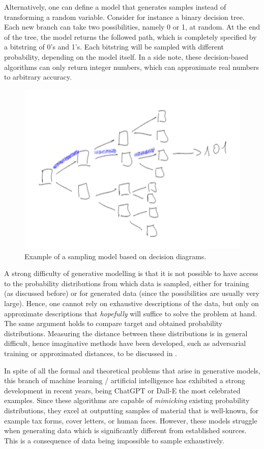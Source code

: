 \documentclass[]{report}
\begin{document}
Alternatively, one can define a model that generates samples instead of transforming a random variable. Consider for instance a binary decision tree. Each new branch can take two possibilities, namely 0 or 1, at random. At the end of the tree, the model returns the followed path, which is completely specified by a bitstring of 0's and 1's. Each bitstring will be sampled with different probability, depending on the model itself. In a side note, these decision-based algorithms can only return integer numbers, which can approximate real numbers to arbitrary accuracy. 
\begin{figure}
\includegraphics[width = \linewidth]{images/decision-tree}
\caption{Example of a sampling model based on decision diagrams. }
\label{fig.decision}
\end{figure}


A strong difficulty of generative modelling is that it is not possible to have access to the probability distributions from which data is sampled, either for training (as discussed before) or for generated data (since the possibilities are usually very large). Hence, one cannot rely on exhaustive descriptions of the data, but only on approximate descriptions that \textit{hopefully} will suffice to solve the problem at hand. The same argument holds to compare target and obtained probability distributions. Measuring the distance between these distributions is in general difficult, hence imaginative methods have been developed, such as adversarial training or approximated distances, to be discussed in . 

In spite of all the formal and theoretical problems that arise in generative models, this branch of machine learning / artificial intelligence has exhibited a strong development in recent years, being ChatGPT or Dall-E the most celebrated examples. Since these algorithms are capable of \textit{mimicking} existing probability distributions, they excel at outputting samples of material that is well-known, for example tax forms, cover letters, or human faces. However, these models struggle when generating data which is significantly different from established sources. This is a consequence of data being impossible to sample exhaustively. 
\end{document}
